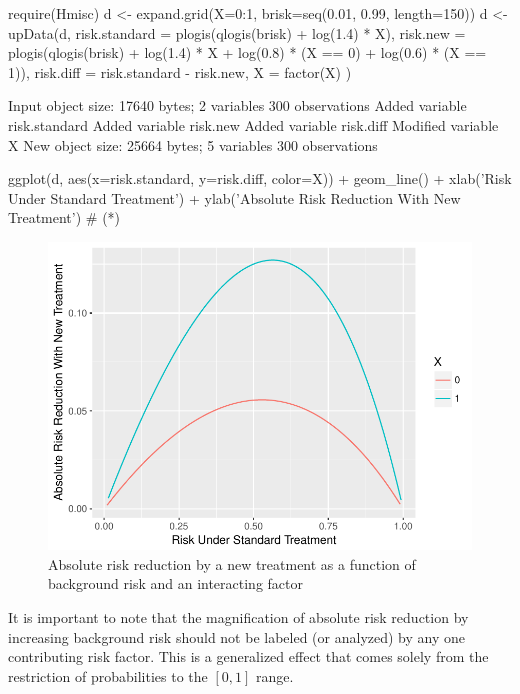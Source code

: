 \begin{Schunk}
\begin{Sinput}
require(Hmisc)
d <- expand.grid(X=0:1, brisk=seq(0.01, 0.99, length=150))
d <- upData(d,
            risk.standard = plogis(qlogis(brisk) + log(1.4) * X),
            risk.new      = plogis(qlogis(brisk) + log(1.4) * X +
                                     log(0.8) * (X == 0) +
                                     log(0.6) * (X == 1)),
            risk.diff     = risk.standard - risk.new,
            X = factor(X) )
\end{Sinput}
\begin{Soutput}
Input object size:	 17640 bytes;	 2 variables	 300 observations
Added variable		risk.standard
Added variable		risk.new
Added variable		risk.diff
Modified variable	X
New object size:	25664 bytes;	5 variables	300 observations
\end{Soutput}
\begin{Sinput}
ggplot(d, aes(x=risk.standard, y=risk.diff, color=X)) +
  geom_line() +
  xlab('Risk Under Standard Treatment') +
  ylab('Absolute Risk Reduction With New Treatment')   # (*\ipacue*)
\end{Sinput}
\begin{figure}[htbp]

\centerline{\includegraphics{ancova-ordiff-1} }

\caption[Absolute risk reduction by background risk and interacting factor]{Absolute risk reduction by a new treatment as a function of background risk and an interacting factor}\label{fig:ancova-ordiff}
\end{figure}
\end{Schunk}
It is important to note that the magnification of absolute risk
reduction by increasing background risk should not be labeled (or
analyzed) by any one contributing risk factor.  This is a generalized
effect that comes solely from the restriction of probabilities to the
$[0,1]$ range.


